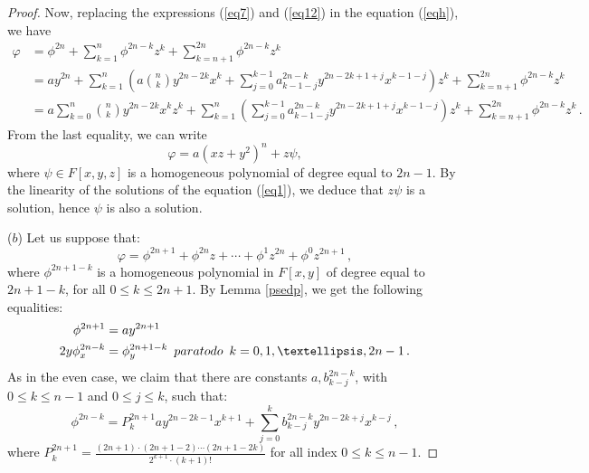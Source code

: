\documentclass{amsart}
\begin{document}
\begin{proof}
	Now, replacing the expressions (\ref{eq7}) and (\ref{eq12}) in the equation (\ref{eqh}), we have  
	\begin{align*}
		\varphi
		&=\phi^{2n}+\sum_{k=1}^{n}\phi^{2n-k}z^k+\sum_{k=n+1}^{2n}\phi^{2n-k}z^k\nonumber\\
		&=ay^{2n}+ \sum_{k=1}^n \left(a\binom{n}{k}y^{2n-2k}x^k+\sum_{j=0}^{k-1} a^{2n-k}_{k-1-j}y^{2n-2k+1+j}x^{k-1-j}\right)z^k +\sum_{k=n+1}^{2n}\phi^{2n-k}z^k\\
		&=a\sum_{k=0}^{n}\binom{n}{k}y^{2n-2k}x^kz^k+ \sum_{k=1}^{n}\left(\sum_{j=0}^{k-1} a^{2n-k}_{k-1-j}y^{2n-2k+1+j}x^{k-1-j}\right)z^k+\sum_{k=n+1}^{2n}\phi^{2n-k}z^k\,.
	\end{align*}
	From  the last equality, we can write
	\begin{equation*}
		\varphi=a(xz+y^2)^n+z\psi, 
	\end{equation*}
	where $\psi\in F[x,y,z]$ is a homogeneous polynomial of degree equal to $2n-1$. By the linearity of the solutions of the equation (\ref{eq1}), we deduce that $z\psi$ is a solution, hence $\psi$ is also a solution.
	
	($b$) Let us suppose that: 
	\begin{equation}\label{eqhi1}
		\varphi=\phi^{2n+1}+\phi^{2n}z+\cdots+\phi^{1}z^{2n}+\phi^0z^{2n+1}\,,
	\end{equation}
	where $\phi^{2n+1-k}$ is a homogeneous  polynomial in $ F[x,y]$ of  degree equal to $2n+1-k$, for all $0\leq k\leq 2n+1$.  By Lemma \ref{psedp}, we get the following equalities:  
	\begin{align}	
		\phi^{2n+1}&=ay^{2n+1}\label{eqi7}\\	
		2y\phi^{2n-k}_x&=\phi^{2n+1-k}_y\,\,\, \textnormal{para todo}\,\,\, k=0,1,\dots, 2n-1\,.\label{eqi8}
	\end{align}
	As in the even case, we claim that there are constants $a,b_{k-j}^{2n-k}$,  with $0\leq k\leq n-1$ and $0\leq j\leq k$, such that:
	\begin{equation}\label{eqodd}
		\phi^{2n-k}=P^{2n+1}_{k}ay^{2n-2k-1}x^{k+1}+\sum_{j=0}^{k}b^{2n-k}_{k-j}y^{2n-2k+j}x^{k-j}\,,
	\end{equation}
	where 
	$
	P^{2n+1}_{k}=\frac{(2n+1)\cdot(2n+1-2)\cdots (2n+1-2k)}{2^{k+1}\cdot (k+1)!}
	$
	for all index $0\leq k\leq n-1$. 
	

\end{proof}
\end{document}
